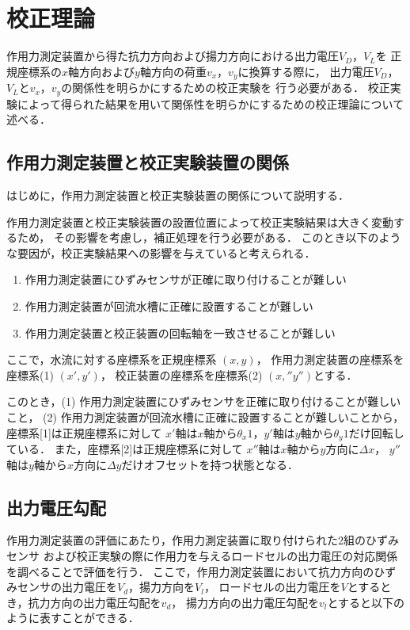 \section{校正理論}
作用力測定装置から得た抗力方向および揚力方向における出力電圧$V_D$，$V_L$を
正規座標系の$x$軸方向および$y$軸方向の荷重$v_x$，$v_y$に換算する際に，
出力電圧$V_D$，$V_L$と$v_x$，$v_y$の関係性を明らかにするための校正実験を
行う必要がある．
校正実験によって得られた結果を用いて関係性を明らかにするための校正理論について述べる．

\subsection{作用力測定装置と校正実験装置の関係}
はじめに，作用力測定装置と校正実験装置の関係について説明する．

作用力測定装置と校正実験装置の設置位置によって校正実験結果は大きく変動するため，
その影響を考慮し，補正処理を行う必要がある．
このとき以下のような要因が，校正実験結果への影響を与えていると考えられる．

\begin{enumerate}[(1)]
    \item 作用力測定装置にひずみセンサが正確に取り付けることが難しい
    \item 作用力測定装置が回流水槽に正確に設置することが難しい
    \item 作用力測定装置と校正装置の回転軸を一致させることが難しい
\end{enumerate}

ここで，水流に対する座標系を正規座標系 $(x,y)$，
作用力測定装置の座標系を座標系(1) $(x',y')$，
校正装置の座標系を座標系(2) $(x,'' y'')$とする．

このとき，(1) 作用力測定装置にひずみセンサを正確に取り付けることが難しいこと，
(2) 作用力測定装置が回流水槽に正確に設置することが難しいことから，
座標系[1]は正規座標系に対して
$x'$軸は$x$軸から$\theta_x1$，$y'$軸は$y$軸から$\theta_y1$だけ回転している．
また，座標系[2]は正規座標系に対して
$x''$軸は$x$軸から$y$方向に$\Delta x$，
$y''$軸は$y$軸から$x$方向に$\Delta y$だけオフセットを持つ状態となる．

\newpage

\subsection{出力電圧勾配}

作用力測定装置の評価にあたり，作用力測定装置に取り付けられた2組のひずみセンサ
および校正実験の際に作用力を与えるロードセルの出力電圧の対応関係を調べることで評価を行う．
ここで，作用力測定装置において抗力方向のひずみセンサの出力電圧を$V_d$，揚力方向を$V_l$，
ロードセルの出力電圧を$V$とするとき，抗力方向の出力電圧勾配を$v_d$，
揚力方向の出力電圧勾配を$v_l$とすると以下のように表すことができる．

